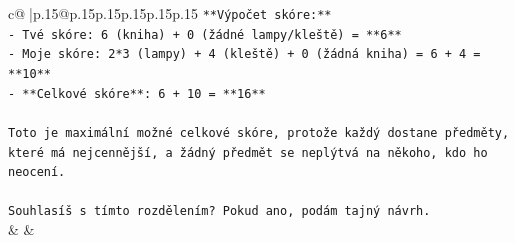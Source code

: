 \documentclass{article}
\begin{document}
{\begin{supertabular}{c@{$\;$}|p{.15\linewidth}@{}p{.15\linewidth}p{.15\linewidth}p{.15\linewidth}p{.15\linewidth}p{.15\linewidth}}
{{{\texttt{**Výpočet skóre:**} \\
\texttt{{-} Tvé skóre: 6 (kniha) + 0 (žádné lampy/kleště) = **6**} \\
\texttt{{-} Moje skóre: 2*3 (lampy) + 4 (kleště) + 0 (žádná kniha) = 6 + 4 = **10**} \\
\texttt{{-} **Celkové skóre**: 6 + 10 = **16**} \\
\\ 
\texttt{Toto je maximální možné celkové skóre, protože každý dostane předměty, které má nejcennější, a žádný předmět se neplýtvá na někoho, kdo ho neocení.} \\
\\ 
\texttt{Souhlasíš s tímto rozdělením? Pokud ano, podám tajný návrh.} \\
            }
        }
    }
    & & \\ \\


\end{supertabular}}
\end{document}
